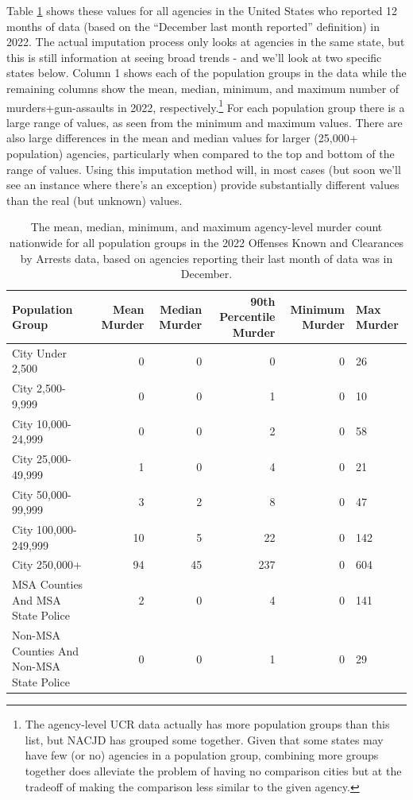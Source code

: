 \documentclass[
  12pt,
  openany]{book}
\begin{document}
Table \ref{tab:countyPopulationGroupStatsNational} shows these values for all agencies in the United States who reported 12 months of data (based on the ``December last month reported'' definition) in 2022. The actual imputation process only looks at agencies in the same state, but this is still information at seeing broad trends - and we'll look at two specific states below. Column 1 shows each of the population groups in the data while the remaining columns show the mean, median, minimum, and maximum number of murders+gun-assaults in 2022, respectively.\footnote{The agency-level UCR data actually has more population groups than this list, but NACJD has grouped some together. Given that some states may have few (or no) agencies in a population group, combining more groups together does alleviate the problem of having no comparison cities but at the tradeoff of making the comparison less similar to the given agency.} For each population group there is a large range of values, as seen from the minimum and maximum values. There are also large differences in the mean and median values for larger (25,000+ population) agencies, particularly when compared to the top and bottom of the range of values. Using this imputation method will, in most cases (but soon we'll see an instance where there's an exception) provide substantially different values than the real (but unknown) values.

\begin{longtable}[t]{lrrrrl}
\caption{\label{tab:countyPopulationGroupStatsNational}The mean, median, minimum, and maximum agency-level murder count nationwide for all population groups in the 2022 Offenses Known and Clearances by Arrests data, based on agencies reporting their last month of data was in December.}\\
\toprule
Population Group & Mean Murder & Median Murder & 90th Percentile Murder & Minimum Murder & Max Murder\\
\midrule
City Under 2,500 & 0 & 0 & 0 & 0 & 26\\
City 2,500-9,999 & 0 & 0 & 1 & 0 & 10\\
City 10,000-24,999 & 0 & 0 & 2 & 0 & 58\\
City 25,000-49,999 & 1 & 0 & 4 & 0 & 21\\
City 50,000-99,999 & 3 & 2 & 8 & 0 & 47\\
\addlinespace
City 100,000-249,999 & 10 & 5 & 22 & 0 & 142\\
City 250,000+ & 94 & 45 & 237 & 0 & 604\\
MSA Counties And MSA State Police & 2 & 0 & 4 & 0 & 141\\
Non-MSA Counties And Non-MSA State Police & 0 & 0 & 1 & 0 & 29\\
\bottomrule
\end{longtable}
\end{document}

